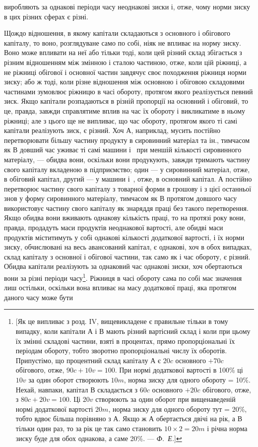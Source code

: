 \parcont{}  %
виробляють за однакові періоди часу неоднакові зиски і, отже,
чому норми зиску в цих різних сферах є різні.

Щождо відношення, в якому капітали складаються з основного і обігового капіталу, то воно,
розглядуване само по собі, ніяк не впливає на норму зиску. Воно може впливати на неї або тільки
тоді, коли цей різний склад збігається з різним відношенням між змінною і сталою частиною, отже,
коли цій ріжниці, а не ріжниці обігової і основної частин завдячує своє походження ріжниця норми
зиску; або ж тоді, коли різне відношення між основною і обіговою складовими частинами зумовлює
ріжницю в часі обороту, протягом якого реалізується певний зиск. Якщо капітали розпадаються в різній
пропорції на основний і обіговий, то це, правда, завжди справлятиме вплив
на час їх обороту і викликатиме в ньому ріжниці; але з цього
ще не випливає, що час обороту, протягом якого ті самі капітали реалізують зиск, є різний. Хоч $А$,
наприклад, мусить постійно перетворювати більшу частину продукту в сировинний матеріал та ін.,
тимчасом як $В$ довший час уживає ті самі
машини і~ при меншій кількості сировинного матеріалу, — обидва вони, оскільки вони продукують,
завжди тримають
частину свого капіталу вкладеною в підприємство; один — у сировинний матеріал, отже, в обіговий
капітал, другий — у машини
і~, отже, в основний капітал. $А$ постійно перетворює частину свого капіталу з товарної форми в
грошову і з цієї останньої знов у форму сировинного матеріалу, тимчасом як $В$ протягом довшого часу
використовує частину свого капіталу як
знаряддя праці без такого перетворення. Якщо обидва вони
вживають однакову кількість праці, то на протязі року вони,
правда, продадуть маси продуктів неоднакової вартості, але
обидві маси продуктів міститимуть у собі однакові кількості
додаткової вартості, і їх норми зиску, обчислювані на весь авансований капітал, є однакові, хоч в
обох випадках, склад капіталу з
основної і обігової частини, так само як і час обороту, є різний.
Обидва капітали реалізують за однаковий час однакові зиски, хоч
обертаються вони за різні періоди часу\footnote{
[Як це випливає з розд. IV, вищевикладене є правильне тільки в тому
випадку, коли капітали $А$ і $В$ мають різний вартісний склад і коли при цьому
їх змінні складові частини, взяті в процентах, прямо пропорціональні їх періодам обороту, тобто
зворотно пропорціональні числу їх оборотів. Припустімо,
що процентний склад капіталу $А$ є $20 c$ основного $+70 c$ обігового, отже,
$90 c + 10 v = 100$. При нормі додаткової вартості в 100\% ці $10 v$ за один оборот створюють $10 m$, норма
зиску для одного обороту = 10\%. Нехай, навпаки, капітал $В$ складається з $60 c$ основного $+20 c$
обігового, отже, з $80 c + 20 v = 100$.
Ці $20 v$ створюють за один оборот при вищенаведеній нормі додаткової вартості $20 m$, норма зиску для
одного обороту тут = 20\%, тобто вдвоє більша
порівняно з $А$. Якщо ж $А$ обертається двічі на рік, а $В$ тільки один раз, то за
рік це так само становить $10 × 2 = 20 m$ і річна норма зиску буде для обох
однакова, а саме 20\%. — \emph{Ф.~Е.}]
}. Ріжниця в часі обороту
сама по собі має значення лиш остільки, оскільки вона впливає
на масу додаткової праці, яка протягом даного часу може бути
\parbreak{}  %
